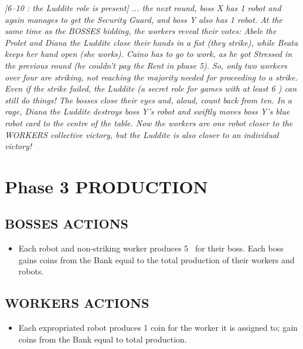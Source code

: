            \textit{[6–10 \faPeopleGroup: the Luddite role is present] ... the next round, boss X has 1 robot and again
            manages to get the Security Guard, and boss Y also has 1 robot. At the same time
            as the BOSSES bidding, the workers reveal their votes: Abele the Prolet and Diana
            the Luddite close their hands in a fist (they strike), while Beata keeps her hand open
            (she works). Caino has to go to work, as he got Stressed in the previous round (he
            couldn't pay the Rent in phase 5). So, only two workers over four are striking, not
            reaching the majority needed for proceeding to a strike. Even if the strike failed, the
            Luddite (a secret role for games with at least 6 \faPeopleGroup) can still do things! The bosses
            close their eyes and, aloud, count back from ten. In a rage, Diana the Luddite destroys
            boss Y's robot and swiftly moves boss Y's blue robot card to the centre of the
            table. Now the workers are one robot closer to the WORKERS collective victory, but
            the Luddite is also closer to an individual victory!}



\section{Phase 3 PRODUCTION}

    \subsection{BOSSES ACTIONS}

        \begin{itemize}
            \item Each robot and non-striking worker produces 5 \faRubleSign\ for their boss. Each boss
            gains coins from the Bank equal to the total production of their workers and
            robots.
        \end{itemize}

    \subsection{WORKERS ACTIONS}

        \begin{itemize}
            \item Each expropriated robot produces 1 coin for the worker it is assigned to;
            gain coins from the Bank equal to total production.
        \end{itemize}
    
